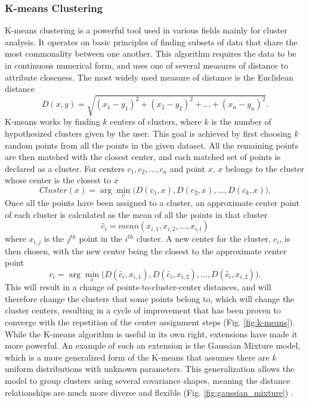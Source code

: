 \subsubsection{K-means Clustering}
K-means clustering is a powerful tool used in various fields mainly for cluster analysis. It operates on basic principles of finding subsets of data that share the most commonality between one another. This algorithm requires the data to be in continuous numerical form, and uses one of several measures of distance to attribute closeness. The most widely used measure of distance is the Euclidean distance 
$$
D(x, y) = \sqrt{(x_1 - y_1)^2 + (x_2 - y_2)^2 + \dots + (x_n - y_n)^2}.
$$
K-means works by finding $k$ centers of clusters, where $k$ is the number of hypothesized clusters given by the user. This goal is achieved by first choosing $k$ random points from all the points in the given dataset. All the remaining points are then matched with the closest center, and each matched set of points is declared as a cluster. For centers $c_1, c_2, \dots, c_n$ and point $x$, $x$ belongs to the cluster whose center is the closest to $x$ 
$$
Cluster(x) = \arg \min_{c} \Big( D(c_1, x), D(c_2, x), \dots, D(c_k, x) \Big).
$$
Once all the points have been assigned to a cluster, an approximate center point of each cluster is calculated as the mean of all the points in that cluster
$$
\hat c_i = mean(x_{i,1}, x_{i,2}, \dots, x_{i,l})
$$
where $x_{i,j}$ is the $j^{th}$ point in the $i^{th}$ cluster.
A new center for the cluster, $c_i$, is then chosen, with the new center being the closest to the approximate center point
$$
c_i = \arg \min_{x} \Big( D(\hat c_i, x_{i, 1}), D(\hat c_i, x_{i, 2}), \dots, D(\hat c_i, x_{i, 2}) \Big ) .
$$
This will result in a change of points-to-cluster-center distances, and will therefore change the clusters that some points belong to, which will change the cluster centers, resulting in a cycle of improvement that has been proven to converge with the repetition of the center assignment steps (Fig. \ref{fig:k-means}). While the K-means algorithm is useful in its own right, extensions have made it more powerful. An example of such an extension is the Gaussian Mixture model, which is a more generalized form of the K-means that assumes there are $k$ uniform distributions with unknown parameters. This generalization allows the model to group clusters using several covariance shapes, meaning the distance relationships are much more diverse and flexible (Fig. \ref{fig:gaussian_mixture}) .

